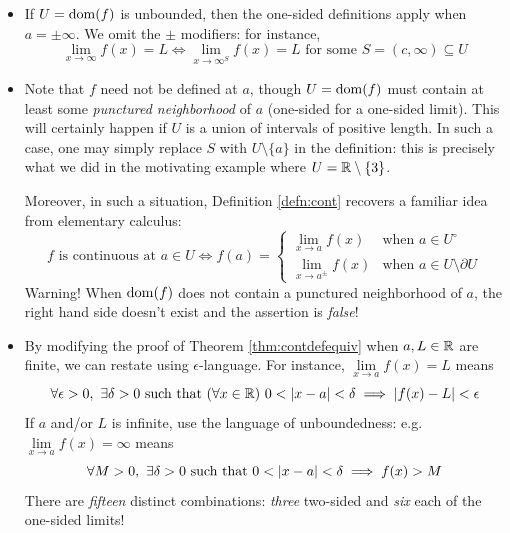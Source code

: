 \begin{itemize}
  \item If $U=\operatorname{dom}(f)$ is unbounded, then the one-sided definitions apply when $a=\pm\infty$. We omit the $\pm$ modifiers: for instance,
  \[
  	\lim_{x\to\infty}f(x)=L\iff 
  	\lim\limits_{x\to\infty^S}f(x)=L\text{ for some }
  	S=(c,\infty)\subseteq U
  \]
	\item\label{it:contlimit} Note that $f$ need not be defined at $a$, though $U=\operatorname{dom}(f)$ must contain at least some \emph{punctured neighborhood} of $a$ (one-sided for a one-sided limit). This will certainly happen if $U$ is a union of intervals of positive length. In such a case, one may simply replace $S$ with $U\setminus\{a\}$ in the definition: this is precisely what we did in the motivating example where $U=\mathbb{R}\setminus\{3\}$.\par
  Moreover, in such a situation, Definition \ref{defn:cont} recovers a familiar idea from elementary calculus:
  \[
  	f \text{ is continuous at } a\in U
  	\iff f(a)=
  	\begin{cases}
  		\lim\limits_{x\to a} f(x)&\text{when }a\in U^\circ\\
  		\lim\limits_{x\to a^\pm} f(x)&\text{when }a\in U\setminus\partial U
  	\end{cases}
  	\tag{$\ast$}
 	\]
 	Warning! When $\operatorname{dom}(f)$ does not contain a punctured neighborhood of $a$, the right hand side doesn't exist and the assertion is \emph{false}!
  \item By modifying the proof of Theorem \ref{thm:contdefequiv} when $a,L\in\mathbb{R}$ are finite, we can restate using $\epsilon$-language. For instance, $\lim\limits_{x\to a}f(x)=L$ means
  \[
  	\forall\epsilon>0,\ \exists \delta>0\text{ such that }(\forall x\in\R)\ 0<\nm{x-a}<\delta\implies \nm{f(x)-L}<\epsilon
  \]
  If $a$ and/or $L$ is infinite, use the language of unboundedness: e.g. $\lim\limits_{x\to a}f(x)=\infty$ means
  \[
  	\forall M>0,\ \exists \delta>0\text{ such that }0<\left| x-a\right|<\delta\implies f(x)>M
  \]
  There are \emph{fifteen} distinct combinations: \emph{three} two-sided and \emph{six} each of the one-sided limits!
\end{itemize}
\goodbreak


